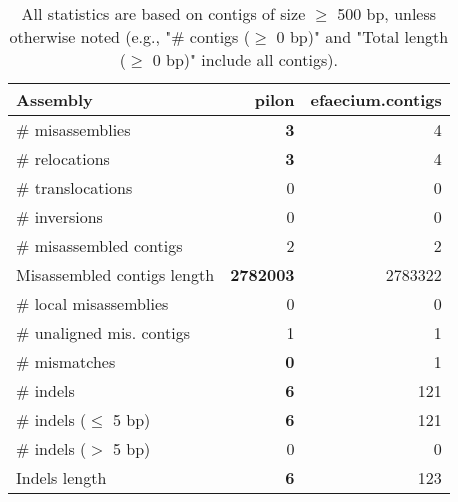 \documentclass[12pt,a4paper]{article}
\begin{document}
\begin{table}[ht]
\begin{center}
\caption{All statistics are based on contigs of size $\geq$ 500 bp, unless otherwise noted (e.g., "\# contigs ($\geq$ 0 bp)" and "Total length ($\geq$ 0 bp)" include all contigs).}
\begin{tabular}{|l*{2}{|r}|}
\hline
Assembly & pilon & efaecium.contigs \\ \hline
\# misassemblies & {\bf 3} & 4 \\ \hline
\hspace{5mm}\# relocations & {\bf 3} & 4 \\ \hline
\hspace{5mm}\# translocations & 0 & 0 \\ \hline
\hspace{5mm}\# inversions & 0 & 0 \\ \hline
\# misassembled contigs & 2 & 2 \\ \hline
Misassembled contigs length & {\bf 2782003} & 2783322 \\ \hline
\# local misassemblies & 0 & 0 \\ \hline
\# unaligned mis. contigs & 1 & 1 \\ \hline
\# mismatches & {\bf 0} & 1 \\ \hline
\# indels & {\bf 6} & 121 \\ \hline
\hspace{5mm}\# indels ($\leq$ 5 bp) & {\bf 6} & 121 \\ \hline
\hspace{5mm}\# indels ($>$ 5 bp) & 0 & 0 \\ \hline
Indels length & {\bf 6} & 123 \\ \hline
\end{tabular}
\end{center}
\end{table}
\end{document}
